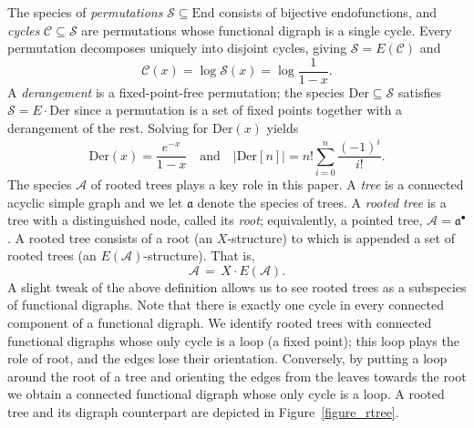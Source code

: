 \documentclass[a4paper,11pt,UKenglish]{article}
\newcommand{\Set}{E}
\newcommand{\Sym}{\mathcal{S}}
\newcommand{\End}{\mathrm{End}}
\newcommand{\Cyc}{\mathcal{C}}
\newcommand{\Der}{\mathrm{Der}}
\newcommand{\rtree}{\mathcal{A}}
\newcommand{\tree}{\mathfrak{a}}
\theoremstyle{definition}
\begin{document}
The species of \emph{permutations} $\Sym\subseteq\End$ consists of
bijective endofunctions, and \emph{cycles} $\Cyc\subseteq\Sym$ are
permutations whose functional digraph is a single cycle. Every
permutation decomposes uniquely into disjoint cycles, giving
$\Sym = \Set(\Cyc)$ and
\[
  \Cyc(x)=\log\Sym(x)=\log\frac{1}{1-x}.
\]
A \emph{derangement} is a fixed-point-free permutation; the species
$\Der\subseteq\Sym$ satisfies $\Sym = \Set\cdot\Der$ since a permutation
is a set of fixed points together with a derangement of the rest.
Solving for $\Der(x)$ yields
\[
\Der(x)= \frac{e^{-x}}{1-x}
\quad\text{and}\quad
|\Der[n]|=n!\sum_{i=0}^n\frac{(-1)^i}{i!}.
\]
The species $\rtree$ of rooted trees plays a key role in this paper.
A \emph{tree} is a connected acyclic simple graph
and we let $\tree$ denote the species of trees.
A \emph{rooted tree} is a tree with a distinguished node, called its
\emph{root}; equivalently, a pointed tree,
$\rtree=\tree^{\bullet}$. A rooted tree consists of
a root (an $X$-structure) to which is appended a set of rooted trees (an $\Set(\rtree)$-structure).
That is,
\[
  \rtree \,=\, X\cdot \Set(\rtree).
\]
A slight tweak of the above definition allows us to see rooted trees as
a subspecies of functional digraphs. Note that there is exactly one
cycle in every connected component of a functional digraph.  We identify
rooted trees with connected functional digraphs whose only cycle is a
loop (a fixed point); this loop plays the role of root, and the edges lose
their orientation.  Conversely, by putting a loop around the root of a
tree and orienting the edges from the leaves towards the root we obtain
a connected functional digraph whose only cycle is a loop. A rooted tree
and its digraph counterpart are depicted in Figure~\ref{figure_rtree}.
\end{document}
